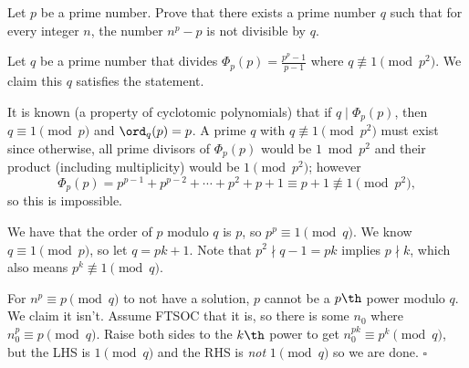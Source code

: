 
\begin{problem}
    Let $p$ be a prime number. Prove that there exists a prime number $q$ such
    that for every integer $n$, the number $n^p-p$ is not divisible by $q$.
\end{problem}

\begin{solution}
    Let $q$ be a prime number that divides $\Phi_p(p) = \tfrac{p^p-1}{p-1}$
    where $q \not\equiv 1 \pmod{p^2}$. We claim this $q$ satisfies the statement.

    It is known (a property of cyclotomic polynomials) that if $q \mid \Phi_p(p)$,
    then $q \equiv 1 \pmod p$ and $\ord_q(p) = p$. A prime $q$ with
    $q \not\equiv 1 \pmod{p^2}$ must exist since otherwise, all prime divisors
    of $\Phi_p(p)$ would be $1 \bmod p^2$ and their product (including multiplicity)
    would be $1 \pmod{p^2}$; however
    \[\Phi_p(p) = p^{p-1} + p^{p-2} + \cdots + p^2 + p + 1 \equiv p+1 \not\equiv 1 \pmod{p^2},\]
    so this is impossible.

    We have that the order of $p$ modulo $q$ is $p$, so $p^p \equiv 1 \pmod q$.
    We know $q \equiv 1 \pmod p$, so let $q = pk+1$. Note that $p^2 \nmid q-1 = pk$
    implies $p \nmid k$, which also means $p^k \not\equiv 1 \pmod q$.

    For $n^p \equiv p \pmod q$ to not have a solution, $p$ cannot be a $p\th$
    power modulo $q$. We claim it isn't. Assume FTSOC that it is, so there is
    some $n_0$ where $n_0^p \equiv p \pmod q$. Raise both sides to the $k\th$
    power to get $n_0^{pk} \equiv p^k \pmod q$, but the LHS is $1 \pmod q$ and
    the RHS is \textit{not} $1 \pmod q$ so we are done. $\square$
\end{solution}